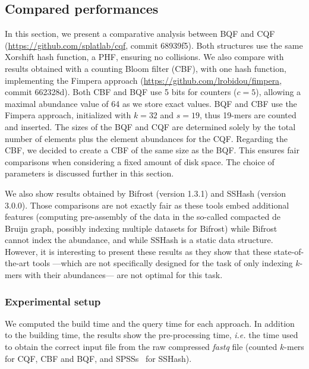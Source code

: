 \subsection{Compared performances}
In this section, we present a comparative analysis between BQF and CQF (\url{https://github.com/splatlab/cqf}, commit 68939f5). Both structures use the same Xorshift hash function, a PHF, ensuring no collisions. We also compare with results obtained with a counting Bloom filter (CBF), with one hash function, implementing the Fimpera approach (\url{https://github.com/lrobidou/fimpera}, commit 662328d). Both CBF and BQF use 5 bits for counters ($c = 5$), allowing a maximal abundance value of 64 as we store exact values. 
BQF and CBF use the Fimpera approach, initialized with $k=32$ and $s=19$, thus 19-mers are counted and inserted. 
The sizes of the BQF and CQF are determined solely by the total number of elements plus the element abundances for the CQF. Regarding the CBF, we decided to create a CBF of the same size as the BQF. This ensures fair comparisons when considering a fixed amount of disk space.
The choice of parameters is discussed further in this section. 

We also show results obtained by Bifrost (version 1.3.1) and SSHash (version 3.0.0). Those comparisons are not exactly fair as these tools embed additional features (computing pre-assembly of the data in the so-called compacted de Bruijn graph, possibly indexing multiple datasets for Bifrost) while Bifrost cannot index the abundance, and while SSHash is a static data structure. However, it is interesting to present these results as they show that these state-of-the-art tools —which are not specifically designed for the task of only indexing $k$-mers with their abundances— are not optimal for this task.

\subsubsection{Experimental setup}
We computed the build time and the query time for each approach. In addition to the building time, the results show the pre-processing time, \textit{i.e.} the time used to obtain the correct input file from the raw compressed \textit{fastq} file (counted $k$-mers for CQF, CBF and BQF, and SPSSs~\cite{RahmanMedvedevRECOMB20} for SSHash). 

